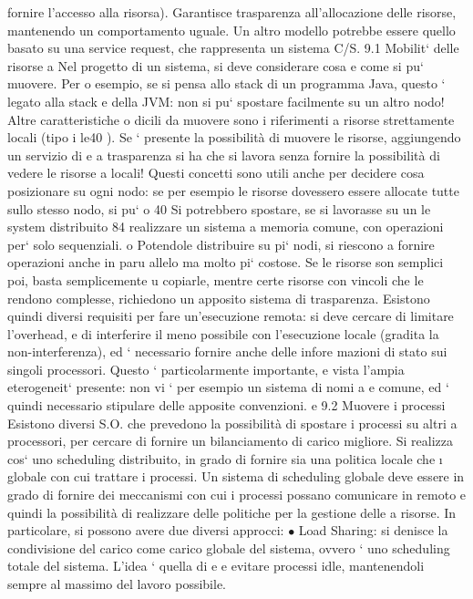 \documentclass[a4paper,12pt]{article}
\begin{document}
fornire l'accesso alla risorsa). Garantisce trasparenza all'allocazione delle risorse,
mantenendo un comportamento uguale. Un altro modello potrebbe essere quello
basato su una service request, che rappresenta un sistema C/S.
9.1
Mobilit` delle risorse
a
Nel progetto di un sistema, si deve considerare cosa e come si pu` muovere. Per
o
esempio, se si pensa allo stack di un programma Java, questo ` legato alla stack
e
della JVM: non si pu` spostare facilmente su un altro nodo! Altre caratteristiche
o
dicili da muovere sono i riferimenti a risorse strettamente locali (tipo i le40 ).
Se ` presente la possibilità di muovere le risorse, aggiungendo un servizio di
e
a
trasparenza si ha che si lavora senza fornire la possibilità di vedere le risorse
a
locali!
Questi concetti sono utili anche per decidere cosa posizionare su ogni nodo:
se per esempio le risorse dovessero essere allocate tutte sullo stesso nodo, si pu`
o
40 Si
potrebbero spostare, se si lavorasse su un le system distribuito
84
\newpage
realizzare un sistema a memoria comune, con operazioni per` solo sequenziali.
o
Potendole distribuire su pi` nodi, si riescono a fornire operazioni anche in paru
allelo ma molto pi` costose. Se le risorse son semplici poi, basta semplicemente
u
copiarle, mentre certe risorse con vincoli che le rendono complesse, richiedono
un apposito sistema di trasparenza.
Esistono quindi diversi requisiti per fare un'esecuzione remota: si deve cercare di limitare l'overhead, e di
interferire il meno possibile con l'esecuzione
locale (gradita la non-interferenza), ed ` necessario fornire anche delle infore
mazioni di stato sui singoli processori. Questo ` particolarmente importante,
e
vista l'ampia eterogeneit` presente: non vi ` per esempio un sistema di nomi
a
e
comune, ed ` quindi necessario stipulare delle apposite convenzioni.
e
9.2
Muovere i processi
Esistono diversi S.O. che prevedono la possibilità di spostare i processi su altri
a
processori, per cercare di fornire un bilanciamento di carico migliore. Si realizza
cos` uno scheduling distribuito, in grado di fornire sia una politica locale che
\i{}
globale con cui trattare i processi. Un sistema di scheduling globale deve essere
in grado di fornire dei meccanismi con cui i processi possano comunicare in
remoto e quindi la possibilità di realizzare delle politiche per la gestione delle
a
risorse.
In particolare, si possono avere due diversi approcci:
$\bullet$ Load Sharing: si denisce la condivisione del carico come carico globale
del sistema, ovvero ` uno scheduling totale del sistema. L'idea ` quella di
e
e
evitare processi idle, mantenendoli sempre al massimo del lavoro possibile.
\end{document}
